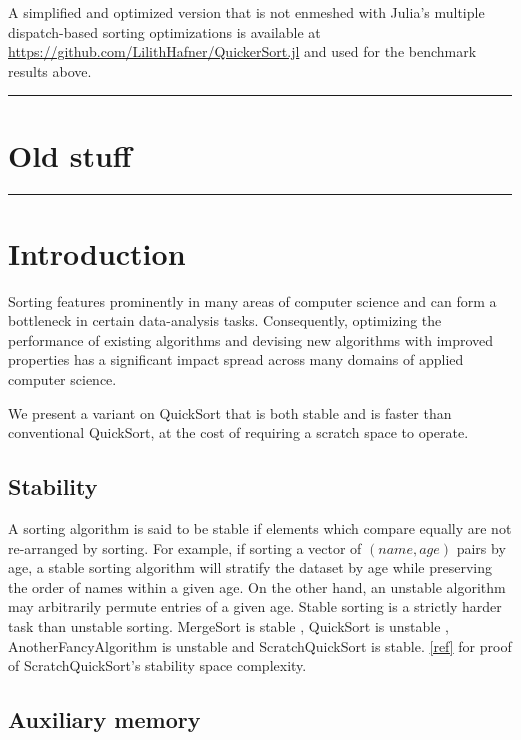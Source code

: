 \documentclass{juliacon}
\begin{document}
A simplified and optimized version that is not enmeshed with Julia's multiple dispatch-based sorting optimizations is available at \href{https://github.com/LilithHafner/QuickerSort.jl}{https://github.com/LilithHafner/QuickerSort.jl}  and used for the benchmark results above.

\hrule

\section{Old stuff}

\hrule

\section{Introduction}

Sorting features prominently in many areas of computer science and can form a bottleneck in certain data-analysis tasks. Consequently, optimizing the performance of existing algorithms and devising new algorithms with improved properties has a significant impact spread across many domains of applied computer science.

We present a variant on QuickSort\cite{quicksort} that is both stable and is faster than conventional QuickSort, at the cost of requiring a scratch space to operate.

\subsection{Stability}

A sorting algorithm is said to be stable if elements which compare equally are not re-arranged by sorting. For example, if sorting a vector of $(name, age)$ pairs by age, a stable sorting algorithm will stratify the dataset by age while preserving the order of names within a given age. On the other hand, an unstable algorithm may arbitrarily permute entries of a given age. Stable sorting is a strictly harder task than unstable sorting. MergeSort is stable \cite{mergesort}, QuickSort is unstable \cite{quicksort}, AnotherFancyAlgorithm is unstable \cite{another_fancy_algorithm} and ScratchQuickSort is stable. \ref{ref} for proof of ScratchQuickSort's stability space complexity.

\subsection{Auxiliary memory}
\end{document}
